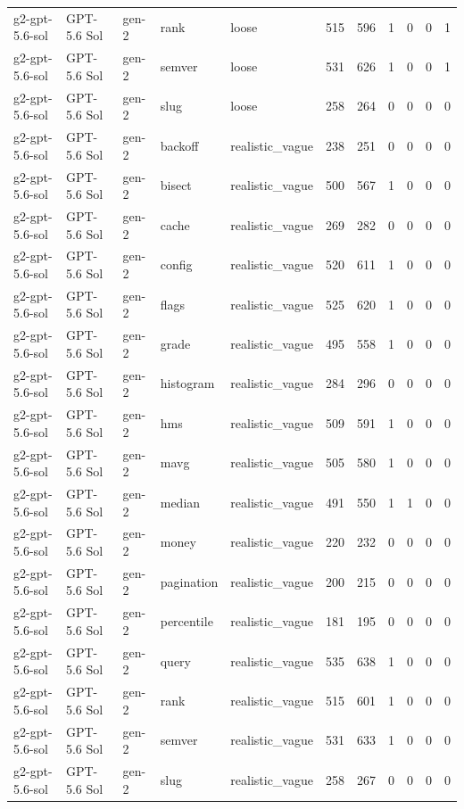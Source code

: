\begin{tabular}{lllllllllll}
g2-gpt-5.6-sol & GPT-5.6 Sol & gen-2 & rank & loose & 515 & 596 & 1 & 0 & 0 & 1 \\
g2-gpt-5.6-sol & GPT-5.6 Sol & gen-2 & semver & loose & 531 & 626 & 1 & 0 & 0 & 1 \\
g2-gpt-5.6-sol & GPT-5.6 Sol & gen-2 & slug & loose & 258 & 264 & 0 & 0 & 0 & 0 \\
g2-gpt-5.6-sol & GPT-5.6 Sol & gen-2 & backoff & realistic\_vague & 238 & 251 & 0 & 0 & 0 & 0 \\
g2-gpt-5.6-sol & GPT-5.6 Sol & gen-2 & bisect & realistic\_vague & 500 & 567 & 1 & 0 & 0 & 0 \\
g2-gpt-5.6-sol & GPT-5.6 Sol & gen-2 & cache & realistic\_vague & 269 & 282 & 0 & 0 & 0 & 0 \\
g2-gpt-5.6-sol & GPT-5.6 Sol & gen-2 & config & realistic\_vague & 520 & 611 & 1 & 0 & 0 & 0 \\
g2-gpt-5.6-sol & GPT-5.6 Sol & gen-2 & flags & realistic\_vague & 525 & 620 & 1 & 0 & 0 & 0 \\
g2-gpt-5.6-sol & GPT-5.6 Sol & gen-2 & grade & realistic\_vague & 495 & 558 & 1 & 0 & 0 & 0 \\
g2-gpt-5.6-sol & GPT-5.6 Sol & gen-2 & histogram & realistic\_vague & 284 & 296 & 0 & 0 & 0 & 0 \\
g2-gpt-5.6-sol & GPT-5.6 Sol & gen-2 & hms & realistic\_vague & 509 & 591 & 1 & 0 & 0 & 0 \\
g2-gpt-5.6-sol & GPT-5.6 Sol & gen-2 & mavg & realistic\_vague & 505 & 580 & 1 & 0 & 0 & 0 \\
g2-gpt-5.6-sol & GPT-5.6 Sol & gen-2 & median & realistic\_vague & 491 & 550 & 1 & 1 & 0 & 0 \\
g2-gpt-5.6-sol & GPT-5.6 Sol & gen-2 & money & realistic\_vague & 220 & 232 & 0 & 0 & 0 & 0 \\
g2-gpt-5.6-sol & GPT-5.6 Sol & gen-2 & pagination & realistic\_vague & 200 & 215 & 0 & 0 & 0 & 0 \\
g2-gpt-5.6-sol & GPT-5.6 Sol & gen-2 & percentile & realistic\_vague & 181 & 195 & 0 & 0 & 0 & 0 \\
g2-gpt-5.6-sol & GPT-5.6 Sol & gen-2 & query & realistic\_vague & 535 & 638 & 1 & 0 & 0 & 0 \\
g2-gpt-5.6-sol & GPT-5.6 Sol & gen-2 & rank & realistic\_vague & 515 & 601 & 1 & 0 & 0 & 0 \\
g2-gpt-5.6-sol & GPT-5.6 Sol & gen-2 & semver & realistic\_vague & 531 & 633 & 1 & 0 & 0 & 0 \\
g2-gpt-5.6-sol & GPT-5.6 Sol & gen-2 & slug & realistic\_vague & 258 & 267 & 0 & 0 & 0 & 0 \\

\end{tabular}
